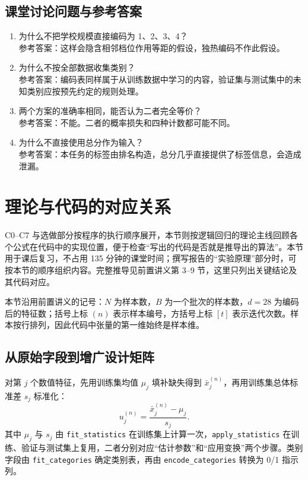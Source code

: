 \documentclass[UTF8,a4paper,11pt,fontset=fandol]{ctexart}
\begin{document}
\subsection{课堂讨论问题与参考答案}
\begin{enumerate}
\item 为什么不把学校规模直接编码为 1、2、3、4？\\
参考答案：这样会隐含相邻档位作用等距的假设，独热编码不作此假设。
\item 为什么不按全部数据收集类别？\\
参考答案：编码表同样属于从训练数据中学习的内容，验证集与测试集中的未知类别应按预先约定的规则处理。
\item 两个方案的准确率相同，能否认为二者完全等价？\\
参考答案：不能。二者的概率损失和四种计数都可能不同。
\item 为什么不直接使用总分作为输入？\\
参考答案：本任务的标签由排名构造，总分几乎直接提供了标签信息，会造成泄漏。
\end{enumerate}
\clearpage
\section{理论与代码的对应关系}\label{sec:theory-code}
C0--C7 与选做部分按程序的执行顺序展开，本节则按逻辑回归的理论主线回顾各个公式在代码中的实现位置，便于检查“写出的代码是否就是推导出的算法”。本节用于课后复习，不占用 135 分钟的课堂时间；撰写报告的“实验原理”部分时，可按本节的顺序组织内容。完整推导见前置讲义第 3--9 节，这里只列出关键结论及其代码对应。

本节沿用前置讲义的记号：$N$ 为样本数，$B$ 为一个批次的样本数，$d=28$ 为编码后的特征数；括号上标 $(n)$ 表示样本编号，方括号上标 $[t]$ 表示迭代次数。样本按行排列，因此代码中张量的第一维始终是样本维。
\subsection{从原始字段到增广设计矩阵}
对第 $j$ 个数值特征，先用训练集均值 $\mu_j$ 填补缺失得到 $\bar x_j^{(n)}$，再用训练集总体标准差 $s_j$ 标准化：
\begin{equation}
u_j^{(n)}=\frac{\bar x_j^{(n)}-\mu_j}{s_j}.
\end{equation}
其中 $\mu_j$ 与 $s_j$ 由 \texttt{fit\_statistics} 在训练集上计算一次，\texttt{apply\_statistics} 在训练、验证与测试集上复用，二者分别对应“估计参数”和“应用变换”两个步骤。类别字段由 \texttt{fit\_categories} 确定类别表，再由 \texttt{encode\_categories} 转换为 0/1 指示列。
\end{document}
